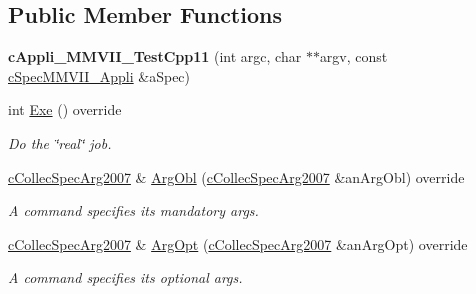 \subsection*{Public Member Functions}
\begin{DoxyCompactItemize}
\item 
{\bfseries c\+Appli\+\_\+\+M\+M\+V\+I\+I\+\_\+\+Test\+Cpp11} (int argc, char $\ast$$\ast$argv, const \hyperlink{classMMVII_1_1cSpecMMVII__Appli}{c\+Spec\+M\+M\+V\+I\+I\+\_\+\+Appli} \&a\+Spec)\hypertarget{classMMVII_1_1cAppli__MMVII__TestCpp11_a3d3f0e710c8cd758176520bc3b20d61e}{}\label{classMMVII_1_1cAppli__MMVII__TestCpp11_a3d3f0e710c8cd758176520bc3b20d61e}

\item 
int \hyperlink{classMMVII_1_1cAppli__MMVII__TestCpp11_ae3ef86089b8167d2c8aa6f3315315472}{Exe} () override\hypertarget{classMMVII_1_1cAppli__MMVII__TestCpp11_ae3ef86089b8167d2c8aa6f3315315472}{}\label{classMMVII_1_1cAppli__MMVII__TestCpp11_ae3ef86089b8167d2c8aa6f3315315472}

\begin{DoxyCompactList}\small\item\em Do the \char`\"{}real\char`\"{} job. \end{DoxyCompactList}\item 
\hyperlink{classMMVII_1_1cCollecSpecArg2007}{c\+Collec\+Spec\+Arg2007} \& \hyperlink{classMMVII_1_1cAppli__MMVII__TestCpp11_adf770fc8138ee7ba9f186d80b04c9edf}{Arg\+Obl} (\hyperlink{classMMVII_1_1cCollecSpecArg2007}{c\+Collec\+Spec\+Arg2007} \&an\+Arg\+Obl) override\hypertarget{classMMVII_1_1cAppli__MMVII__TestCpp11_adf770fc8138ee7ba9f186d80b04c9edf}{}\label{classMMVII_1_1cAppli__MMVII__TestCpp11_adf770fc8138ee7ba9f186d80b04c9edf}

\begin{DoxyCompactList}\small\item\em A command specifies its mandatory args. \end{DoxyCompactList}\item 
\hyperlink{classMMVII_1_1cCollecSpecArg2007}{c\+Collec\+Spec\+Arg2007} \& \hyperlink{classMMVII_1_1cAppli__MMVII__TestCpp11_a0172ad08d02902d0d4819464140b29c9}{Arg\+Opt} (\hyperlink{classMMVII_1_1cCollecSpecArg2007}{c\+Collec\+Spec\+Arg2007} \&an\+Arg\+Opt) override\hypertarget{classMMVII_1_1cAppli__MMVII__TestCpp11_a0172ad08d02902d0d4819464140b29c9}{}\label{classMMVII_1_1cAppli__MMVII__TestCpp11_a0172ad08d02902d0d4819464140b29c9}

\begin{DoxyCompactList}\small\item\em A command specifies its optional args. \end{DoxyCompactList}\end{DoxyCompactItemize}

